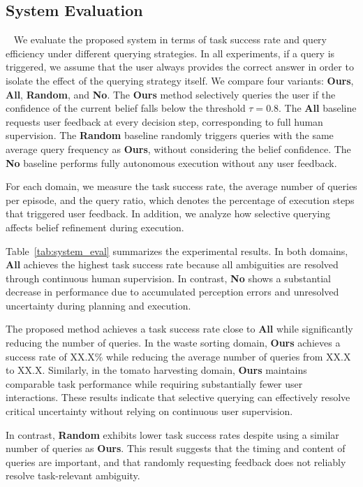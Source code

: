 \subsection{System Evaluation}~\label{exp:sys_eval}
We evaluate the proposed system in terms of task success rate and query efficiency under different querying strategies. In all experiments, if a query is triggered, we assume that the user always provides the correct answer in order to isolate the effect of the querying strategy itself. We compare four variants: \textbf{Ours}, \textbf{All}, \textbf{Random}, and \textbf{No}. The \textbf{Ours} method selectively queries the user if the confidence of the current belief falls below the threshold $\tau=0.8$. The \textbf{All} baseline requests user feedback at every decision step, corresponding to full human supervision. The \textbf{Random} baseline randomly triggers queries with the same average query frequency as \textbf{Ours}, without considering the belief confidence. The \textbf{No} baseline performs fully autonomous execution without any user feedback.

For each domain, we measure the task success rate, the average number of queries per episode, and the query ratio, which denotes the percentage of execution steps that triggered user feedback. In addition, we analyze how selective querying affects belief refinement during execution.


Table~\ref{tab:system_eval} summarizes the experimental results. In both domains, \textbf{All} achieves the highest task success rate because all ambiguities are resolved through continuous human supervision. In contrast, \textbf{No} shows a substantial decrease in performance due to accumulated perception errors and unresolved uncertainty during planning and execution.

The proposed method achieves a task success rate close to \textbf{All} while significantly reducing the number of queries. In the waste sorting domain, \textbf{Ours} achieves a success rate of XX.X\% while reducing the average number of queries from XX.X to XX.X. Similarly, in the tomato harvesting domain, \textbf{Ours} maintains comparable task performance while requiring substantially fewer user interactions. These results indicate that selective querying can effectively resolve critical uncertainty without relying on continuous user supervision.

In contrast, \textbf{Random} exhibits lower task success rates despite using a similar number of queries as \textbf{Ours}. This result suggests that the timing and content of queries are important, and that randomly requesting feedback does not reliably resolve task-relevant ambiguity.

